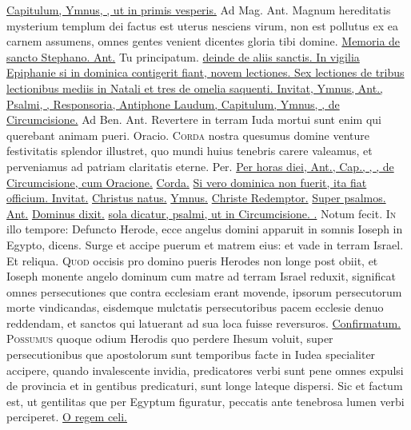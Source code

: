 \begin{multicols*}{2}
 \ul{Capitulum, Ymnus, \Vbar , ut in primis vesperis.} {\color{Red} Ad Mag. Ant.} Magnum hereditatis mysterium templum dei factus est uterus nesciens virum, non est pollutus ex ea carnem assumens, omnes gentes venient dicentes gloria tibi domine. \ul{Memoria de sancto Stephano. Ant.} Tu principatum. \ul{deinde de aliis sanctis. In vigilia Epiphanie si in dominica contigerit fiant, novem lectiones. Sex lectiones de tribus lectionibus mediis in Natali et tres de omelia saquenti. Invitat, Ymnus, Ant., Psalmi, \Vbar , Responsoria, Antiphone Laudum, Capitulum, Ymnus, \Vbar , de Circumcisione.} {\color{Red} Ad Ben. Ant.} {\color{Red} Revertere in terram Iuda mortui sunt enim qui querebant animam pueri.} {\color{Red} Oracio.}
\lettrine[lines=2]{\zallmancaps \color{Blue} C}{orda} \hypertarget{corda-nostra-vigilia-epiphanie}{nostra} quesumus domine venture festivitatis splendor illustret, quo mundi huius tenebris carere valeamus, et perveniamus ad patriam claritatis eterne. Per.
\newline \ul{Per horas diei, Ant., Cap., \Rbar , \Vbar , de Circumcisione, cum Oracione.} \hyperlink{corda-nostra-vigilia-epiphanie}{Corda.} \ul{Si vero dominica non fuerit, ita fiat officium. Invitat.} \hyperlink{christus-natus-invitatorium}{Christus natus.} \ul{Ymnus.} \hyperlink{christe-redemptor}{Christe Redemptor.} \ul{Super psalmos. Ant.} \hyperlink{ant-dominus-dixit}{Dominus dixit.} \ul{sola dicatur, psalmi, ut in Circumcisione. \Vbar .} Notum fecit.
\lettrine[lines=2]{\zallmancaps \color{Red} I}{n} illo tempore: Defuncto Herode, ecce angelus domini apparuit in somnis Ioseph in Egypto, dicens. Surge et accipe puerum et matrem eius: et vade in terram Israel. Et reliqua.
\lettrine[lines=2]{\zallmancaps \color{Blue} Q}{uod} occisis pro domino pueris Herodes non longe post obiit, et Ioseph monente angelo dominum cum matre ad terram Israel reduxit, significat omnes persecutiones que contra ecclesiam erant movende, ipsorum persecutorum morte vindicandas, eisdemque mulctatis persecutoribus pacem ecclesie denuo reddendam, et sanctos qui latuerant ad sua loca fuisse reversuros. \R \hyperlink{confirmatum-est-cor}{Confirmatum.}
\lettrine[lines=2]{\zallmancaps \color{Red} P}{ossumus} quoque odium Herodis quo perdere Ihesum voluit, super persecutionibus que apostolorum sunt temporibus facte in Iudea specialiter accipere, quando invalescente invidia, predicatores verbi sunt pene omnes expulsi de provincia et in gentibus predicaturi, sunt longe lateque dispersi. Sic et factum est, ut gentilitas que per Egyptum figuratur, peccatis ante tenebrosa lumen verbi perciperet. \R \hyperlink{o-regem-celi}{O regem celi.}

\end{multicols*}
